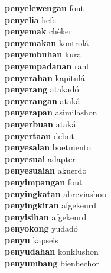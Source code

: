 \textbf{penyelewengan } fout \\
\textbf{penyelia } hefe \\
\textbf{penyemak } chèker \\
\textbf{penyemakan } kontrolá \\
\textbf{penyembuhan } kura \\
\textbf{penyempadanan } rant \\
\textbf{penyerahan } kapitulá \\
\textbf{penyerang } atakadó \\
\textbf{penyerangan } ataká \\
\textbf{penyerapan } asimilashon \\
\textbf{penyerbuan } ataká \\
\textbf{penyertaan } debut \\
\textbf{penyesalan } boetmento \\
\textbf{penyesuai } adapter \\
\textbf{penyesuaian } akuerdo \\
\textbf{penyimpangan } fout \\
\textbf{penyingkatan } abreviashon \\
\textbf{penyingkiran } afgekeurd \\
\textbf{penyisihan } afgekeurd \\
\textbf{penyokong } yudadó \\
\textbf{penyu } kapseis \\
\textbf{penyudahan } konklushon \\
\textbf{penyumbang } bienhechor \\
